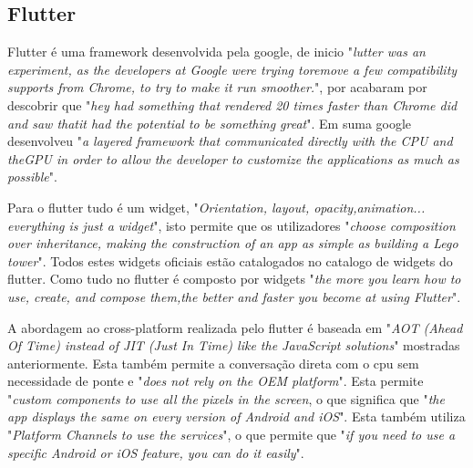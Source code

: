 \subsection{Flutter}
Flutter é uma framework desenvolvida pela google, de inicio "\emph{lutter was an experiment, as the developers at Google were trying toremove a few compatibility supports from Chrome, to try to make it run smoother.}", por acabaram por descobrir que "\emph{hey had something that rendered 20 times faster than Chrome did and saw thatit had the potential to be something great}". Em suma google desenvolveu "\emph{a layered framework that communicated directly with the CPU and theGPU in order to allow the developer to customize the applications as much as possible}".

Para o flutter tudo é um widget, "\emph{Orientation, layout, opacity,animation... everything is just a widget}", isto permite que os utilizadores "\emph{choose composition over inheritance, making the construction of an app as simple as building a Lego tower}". Todos estes widgets oficiais estão catalogados no catalogo de widgets do flutter. Como tudo no flutter é composto por widgets "\emph{the more you learn how to use, create, and compose them,the better and faster you become at using Flutter}".

A abordagem ao cross-platform realizada pelo flutter é baseada em  "\emph{AOT (Ahead Of Time) instead of JIT (Just In Time) like the JavaScript solutions}" mostradas anteriormente. Esta também permite a conversação direta com o cpu sem necessidade de ponte e "\emph{does not rely on the OEM platform}". Esta permite "\emph{custom components to use all the pixels in the screen}, o que significa que "\emph{the app displays the same on every version of Android and iOS}". Esta também utiliza "\emph{Platform Channels to use the services}", o que permite que "\emph{if you need to use a specific Android or iOS feature, you can do it easily}".